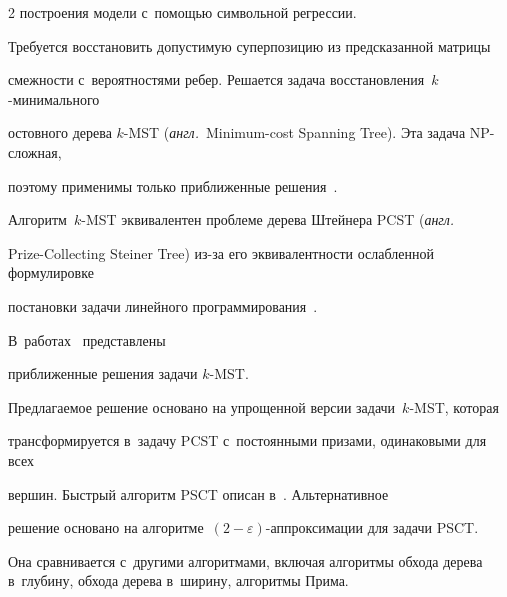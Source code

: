 \begin{multicols}{2}
построения модели с~помощью символьной регрессии.



Требуется восстановить допустимую суперпозицию из предсказанной мат\-ри\-цы 

смежности с~вероятностями ребер. Решается задача вос\-ста\-нов\-ле\-ния~$k$-минимального 

остовного дерева $k$-MST (\textit{англ.}\ Minimum-cost Spanning Tree). Эта задача NP-слож\-ная, 

поэтому применимы только при\-бли\-жен\-ные решения~\cite{ravi1996spanning}. 

Алгоритм~$k$-MST эквивалентен проб\-ле\-ме дерева Штейнера PCST (\textit{англ.}\ 

Prize-Collecting Steiner Tree) из-за его эквивалентности ослабленной формулировке 

постановки задачи линейного программирования~\cite{chudak2004approximate}. 

В~работах~\cite{ravi1996spanning,awerbuch1998new,arora20062+} пред\-став\-ле\-ны 

приближенные решения задачи \mbox{$k$-MST}.







Предлагаемое решение основано на упрощенной версии задачи~$k$-MST, которая 

трансформируется в~задачу PCST с~постоянными призами, одинаковыми для всех 

вершин. Быст\-рый алгоритм PSCT описан в~\cite{hegde2014fast}. Альтернативное 

решение основано на алгоритме~$(2-\varepsilon)$-аппроксимации для задачи PSCT. 

Она сравнивается с~другими алгоритмами, включая алгоритмы обхода дерева в~глубину, обхода дерева в~ширину, алгоритмы Прима.



\begin{table}[b]\small  %

\vspace*{-12pt}

\begin{center}

        \parbox{300pt}{



}


\end{center}
\end{table}
\end{multicols}
